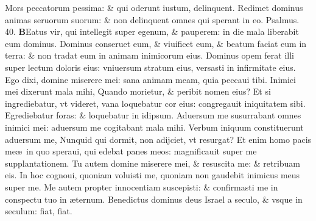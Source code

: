 \documentclass[a5paper,10pt]{book}
\def\ae{æ}
\begin{document}
\begin{multicols*}{2}
\newline \color{red} M\color{black}ors peccatorum pessima: \& qui oderunt iustum, delinquent.
\newline \color{red} R\color{black}edimet dominus animas seruorum suorum: \& non delinquent omnes qui sperant in eo. \quad \color{red} Psalmus. 40. \color{black}
\vspace{-1em}
\lettrine[lines=2]{\bfseries \color{red} B}{}Eatus vir, qui intellegit super egenum, \& pauperem: in die mala liberabit eum dominus.%
\newline \color{red} D\color{black}ominus conseruet eum, \& viuificet eum, \& beatum faciat eum in terra: \& non tradat eum in animam inimicorum eius.
\newline \color{red} D\color{black}ominus opem ferat illi super lectum doloris eius: vniuersum stratum eius, versasti in infirmitate eius.
\newline \color{red} E\color{black}go dixi, domine miserere mei: sana animam meam, quia peccaui tibi.
\newline \color{red} I\color{black}nimici mei dixerunt mala mihi, Quando morietur, \& peribit nomen eius?
\newline \color{red} E\color{black}t si ingrediebatur, vt videret, vana loquebatur cor eius: congregauit iniquitatem sibi.
\newline \color{red} E\color{black}grediebatur foras: \& loquebatur in idipsum.
\newline \color{red} A\color{black}duersum me susurrabant omnes inimici mei: aduersum me cogitabant mala mihi.
\newline \color{red} V\color{black}erbum iniquum constituerunt aduersum me, Nunquid qui dormit, non adijciet, vt resurgat?
\newline \color{red} E\color{black}t enim homo pacis me\ae \ in quo speraui, qui edebat panes meos: magnificauit super me supplantationem.%
\newline \color{red} T\color{black}u autem domine miserere mei, \& resuscita me: \& retribuam eis.
\newline \color{red} I\color{black}n hoc cognoui, quoniam voluisti me, quoniam non gaudebit inimicus meus super me.
\newline \color{red} M\color{black}e autem propter innocentiam suscepisti: \& confirmasti me in conspectu tuo in \ae ternum.
\newline \color{red} B\color{black}enedictus dominus deus Israel a seculo, \& vsque in seculum: fiat, fiat.

\end{multicols*}
\end{document}
